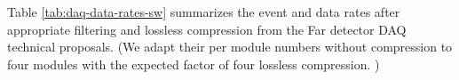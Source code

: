 Table \ref{tab:daq-data-rates-sw} summarizes the event and data rates after appropriate filtering and lossless compression from the Far detector DAQ technical proposals.   (We adapt their per module numbers without compression to four modules with the expected factor of four lossless compression. )


